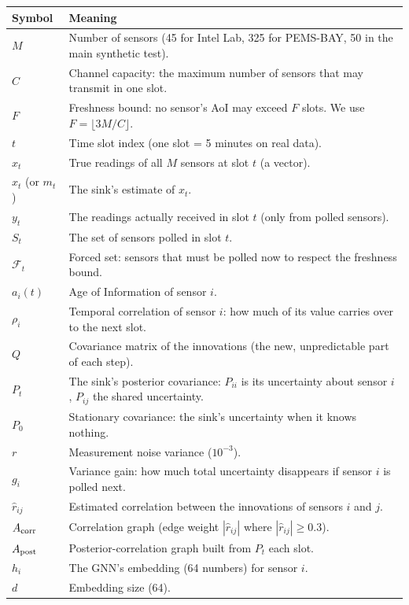 {\small
\begin{longtable}{@{}p{2.6cm}p{12.8cm}@{}}
\toprule
\textbf{Symbol} & \textbf{Meaning} \\
\midrule
\endhead
$M$ & Number of sensors (45 for Intel Lab, 325 for PEMS-BAY, 50 in the main synthetic test). \\
$C$ & Channel capacity: the maximum number of sensors that may transmit in one slot. \\
$F$ & Freshness bound: no sensor's AoI may exceed $F$ slots. We use $F=\lfloor 3M/C\rfloor$. \\
$t$ & Time slot index (one slot = 5 minutes on real data). \\
$x_t$ & True readings of all $M$ sensors at slot $t$ (a vector). \\
$\hat x_t$ (or $m_t$) & The sink's estimate of $x_t$. \\
$y_t$ & The readings actually received in slot $t$ (only from polled sensors). \\
$S_t$ & The set of sensors polled in slot $t$. \\
$\mathcal F_t$ & Forced set: sensors that must be polled now to respect the freshness bound. \\
$a_i(t)$ & Age of Information of sensor $i$. \\
$\rho_i$ & Temporal correlation of sensor $i$: how much of its value carries over to the next slot. \\
$Q$ & Covariance matrix of the innovations (the new, unpredictable part of each step). \\
$P_t$ & The sink's posterior covariance: $P_{ii}$ is its uncertainty about sensor $i$, $P_{ij}$ the shared uncertainty. \\
$P_0$ & Stationary covariance: the sink's uncertainty when it knows nothing. \\
$r$ & Measurement noise variance ($10^{-3}$). \\
$g_i$ & Variance gain: how much total uncertainty disappears if sensor $i$ is polled next. \\
$\hat r_{ij}$ & Estimated correlation between the innovations of sensors $i$ and $j$. \\
$A_{\mathrm{corr}}$ & Correlation graph (edge weight $|\hat r_{ij}|$ where $|\hat r_{ij}|\ge 0.3$). \\
$A_{\mathrm{post}}$ & Posterior-correlation graph built from $P_t$ each slot. \\
$h_i$ & The GNN's embedding (64 numbers) for sensor $i$. \\
$d$ & Embedding size (64). \\

\end{longtable}}

